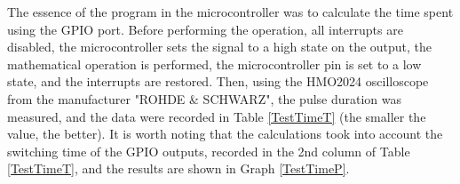 The essence of the program in the microcontroller was to calculate the time spent using the GPIO port. Before performing the operation, all interrupts are disabled, the microcontroller sets the signal to a high state on the output, the mathematical operation is performed, the microcontroller pin is set to a low state, and the interrupts are restored. Then, using the HMO2024 oscilloscope from the manufacturer "ROHDE \& SCHWARZ", the pulse duration was measured, and the data were recorded in Table \ref{TestTimeT} (the smaller the value, the better). It is worth noting that the calculations took into account the switching time of the GPIO outputs, recorded in the 2nd column of Table \ref{TestTimeT}, and the results are shown in Graph \ref{TestTimeP}.







